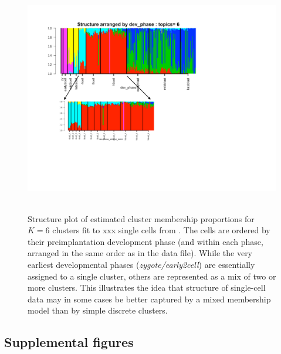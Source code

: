 \begin{figure}[ht]
\centering
\includegraphics[height=4in, width=5.5in]{../plots/deng_structure_6.pdf}
\caption{Structure plot of estimated cluster membership proportions for $K=6$ clusters fit to xxx single cells from  \cite{Deng2014}. The cells are ordered
by their preimplantation development phase (and within each phase, arranged in the same order as in the data file). While the very earliest developmental phases 
(\textit{zygote/early2cell}) are essentially assigned to a single cluster, others are represented as a mix of two or more clusters. This illustrates the idea that
structure of single-cell data may in some cases be better captured by a mixed membership model than by simple discrete clusters.}
\label{fig:fig4}
\end{figure}


 \clearpage
 \subsection{Supplemental figures}
 
